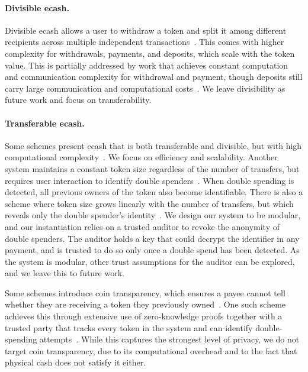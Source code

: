 \paragraph{Divisible ecash.} Divisible ecash allows a user to withdraw a token
and split it among different recipients across multiple independent
transactions~\cite{C:OkaOht91,C:Okamoto95}. This comes with higher
complexity for withdrawals, payments, and deposits, which scale with the token
value. This is partially addressed by work that achieves constant computation
and communication complexity for withdrawal and payment, though deposits still
carry large communication and computational
costs~\cite{PKC:CPST15,ACNS:CPST15}. We leave divisibility as future work and
focus on transferability.

\paragraph{Transferable ecash.} Some schemes present ecash that is both
transferable and divisible, but with high computational
complexity~\cite{C:OkaOht91,EC:ChaPed92}. We focus on efficiency and
scalability.  Another system maintains a constant token size regardless of the
number of transfers, but requires user interaction to identify double
spenders~\cite{CANS:FucPoiVer09}. When double spending is detected, all
previous owners of the token also become identifiable. There is also a scheme
where token size grows linearly with the number of transfers, but which reveals
only the double spender's identity~\cite{PKC:BCFK15}. We design our system to
be modular, and our instantiation relies on a trusted auditor to revoke the
anonymity of double spenders. The auditor holds
a key that could decrypt the identifier in any payment, and is trusted to do so
only once a double spend has been detected. As the system is modular, other
trust assumptions for the auditor can be explored, and we leave this to future
work.

Some schemes introduce coin transparency, which ensures a payee cannot tell
whether they are receiving a token they previously
owned~\cite{ACNS:CanGou08,PKC:BauFucQia21}. One such scheme achieves this
through extensive use of zero-knowledge proofs together with a trusted party
that tracks every token in the system and can identify double-spending
attempts~\cite{AFRICACRYPT:BCFGST11}. While this captures the strongest level
of privacy, we do not target coin transparency, due to its computational
overhead and to the fact that physical cash does not satisfy it either.

